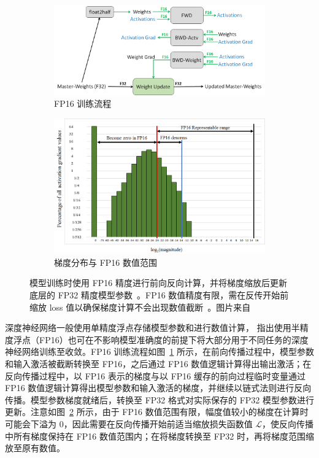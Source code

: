 \begin{figure}[htb]
  \centering
  \begin{subfigure}[t]{0.45\columnwidth}
    \centering
    \includegraphics[width=\columnwidth]{Img/Background/mixed_prec_iteration.png}
    \caption{FP16 训练流程}
    \label{img::background::fp16_ops}
  \end{subfigure}
  \quad
  \begin{subfigure}[t]{0.45\columnwidth}
    \centering
    \includegraphics[width=\columnwidth]{Img/Background/ssd_ag_log_histo_coarse.png}
    \caption{梯度分布与 FP16 数值范围}
    \label{img::background::fp16_grads}
  \end{subfigure}
  \caption{模型训练时使用 FP16 精度进行前向反向计算，并将梯度缩放后更新底层的 FP32 精度模型参数~。FP16 数值精度有限，需在反传开始前缩放 loss 值以确保梯度计算不会出现数值截断~。图片来自~\citet{micikevicius2018mixed}}
  \label{img::background::fp16_training}
\end{figure}

深度神经网络一般使用单精度浮点存储模型参数和进行数值计算，\citet{micikevicius2018mixed} 指出使用半精度浮点（FP16）也可在不影响模型准确度的前提下将大部分用于不同任务的深度神经网络训练至收敛。FP16 训练流程如图~\ref{img::background::fp16_ops} 所示，在前向传播过程中，模型参数和输入激活被截断转换至 FP16，之后通过 FP16 数值逻辑计算得出输出激活；在反向传播过程中，以 FP16 表示的梯度与以 FP16 缓存的前向过程临时变量通过 FP16 数值逻辑计算得出模型参数和输入激活的梯度，并继续以链式法则进行反向传播。模型参数梯度就绪后，转换至 FP32 格式对实际保存的 FP32 模型参数进行更新。注意如图~\ref{img::background::fp16_grads} 所示，由于 FP16 数值范围有限，幅度值较小的梯度在计算时可能会下溢为 0，因此需要在反向传播开始前适当缩放损失函数值 $\mathcal{L}$，使反向传播中所有梯度保持在 FP16 数值范围内；在将梯度转换至 FP32 时，再将梯度范围缩放至原有数值。

